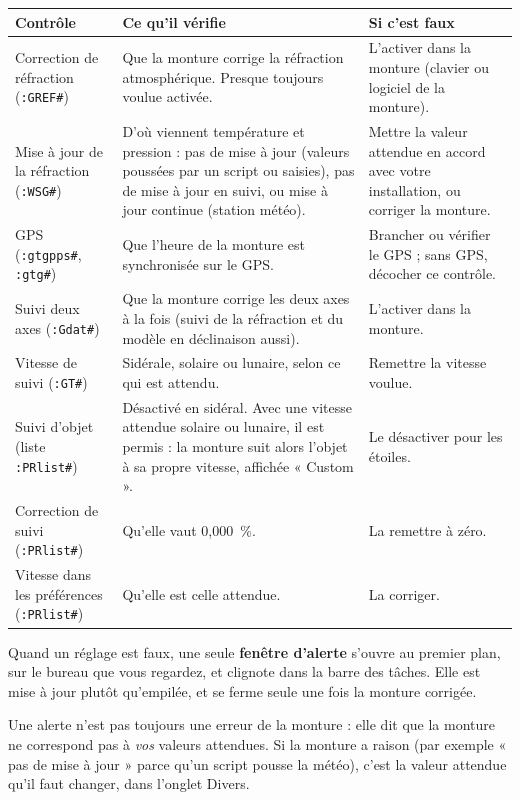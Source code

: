 \begin{center}
\begin{tabularx}{\textwidth}{p{3.3cm}Xp{4.2cm}}
\toprule
\textbf{Contrôle} & \textbf{Ce qu'il vérifie} & \textbf{Si c'est faux} \\
\midrule
Correction de réfraction (\texttt{:GREF\#}) & Que la monture corrige la
réfraction atmosphérique. Presque toujours voulue activée. & L'activer dans la
monture (clavier ou logiciel de la monture). \\
Mise à jour de la réfraction (\texttt{:WSG\#}) & D'où viennent température et
pression : pas de mise à jour (valeurs poussées par un script ou saisies), pas
de mise à jour en suivi, ou mise à jour continue (station météo). & Mettre la
valeur attendue en accord avec votre installation, ou corriger la monture. \\
GPS (\texttt{:gtgpps\#}, \texttt{:gtg\#}) & Que l'heure de la monture est
synchronisée sur le GPS. & Brancher ou vérifier le GPS ; sans GPS, décocher ce
contrôle. \\
Suivi deux axes (\texttt{:Gdat\#}) & Que la monture corrige les deux axes à la
fois (suivi de la réfraction et du modèle en déclinaison aussi). & L'activer
dans la monture. \\
Vitesse de suivi (\texttt{:GT\#}) & Sidérale, solaire ou lunaire, selon ce qui
est attendu. & Remettre la vitesse voulue. \\
Suivi d'objet (liste \texttt{:PRlist\#}) & Désactivé en sidéral. Avec une
vitesse attendue solaire ou lunaire, il est permis : la monture suit alors
l'objet à sa propre vitesse, affichée « Custom ». & Le désactiver pour les
étoiles. \\
Correction de suivi (\texttt{:PRlist\#}) & Qu'elle vaut 0,000~\%. & La remettre
à zéro. \\
Vitesse dans les préférences (\texttt{:PRlist\#}) & Qu'elle est celle
attendue. & La corriger. \\
\bottomrule
\end{tabularx}
\end{center}

Quand un réglage est faux, une seule \textbf{fenêtre d'alerte} s'ouvre au
premier plan, sur le bureau que vous regardez, et clignote dans la barre des
tâches. Elle est mise à jour plutôt qu'empilée, et se ferme seule une fois la
monture corrigée.


\begin{tip}
Une alerte n'est pas toujours une erreur de la monture : elle dit que la
monture ne correspond pas à \emph{vos} valeurs attendues. Si la monture a
raison (par exemple « pas de mise à jour » parce qu'un script pousse la météo),
c'est la valeur attendue qu'il faut changer, dans l'onglet Divers.
\end{tip}

